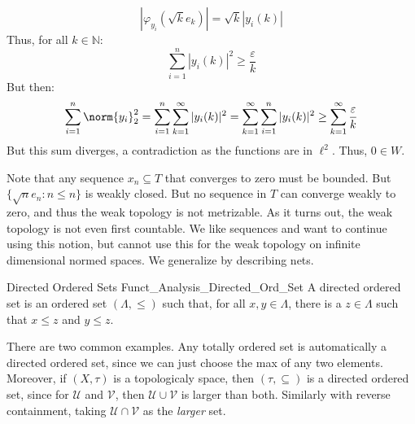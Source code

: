 \begin{lexample}
            \begin{equation}
                |\varphi_{y_{i}}(\sqrt{k}e_{k})|=
                \sqrt{k}|y_{i}(k)|
            \end{equation}
            Thus, for all $k\in\mathbb{N}$:
            \begin{equation}
                \sum_{i=1}^{n}|y_{i}(k)|^{2}\geq
                \frac{\varepsilon}{k}
            \end{equation}
            But then:
            \begin{equation}
                \sum_{i=1}^{n}\norm{y_{i}}_{2}^{2}
                =\sum_{i=1}^{n}\sum_{k=1}^{\infty}
                    |y_{i}(k)|^{2}
                =\sum_{k=1}^{\infty}\sum_{i=1}^{n}
                    |y_{i}(k)|^{2}\geq\sum_{k=1}^{\infty}
                        \frac{\varepsilon}{k}
            \end{equation}
            But this sum diverges, a contradiction as the functions
            are in $\ell^{2}$. Thus, $0\in{W}$.
        \end{lexample}
        Note that any sequence $x_{n}\subseteq{T}$ that converges
        to zero must be bounded. But $\{\sqrt{n}e_{n}:n\leq{n}\}$
        is weakly closed. But no sequence in $T$ can converge weakly
        to zero, and thus the weak topology is not metrizable.
        As it turns out, the weak topology is not even
        first countable. We like sequences and want to continue
        using this notion, but cannot use this for the weak
        topology on infinite dimensional normed spaces. We
        generalize by describing nets.
        \begin{ldefinition}{Directed Ordered Sets}
              {Funct_Analysis_Directed_Ord_Set}
            A directed ordered set is an ordered set
            $(\Lambda,\leq)$ such that, for all $x,y\in\Lambda$,
            there is a $z\in\Lambda$ such that
            $x\leq{z}$ and $y\leq{z}$.
        \end{ldefinition}
        \begin{lexample}
            There are two common examples. Any totally ordered
            set is automatically a directed ordered set,
            since we can just choose the max of any two elements.
            Moreover, if $(X,\tau)$ is a topologicaly space, then
            $(\tau,\subseteq)$ is a directed ordered set, since
            for $\mathcal{U}$ and $\mathcal{V}$, then
            $\mathcal{U}\cup\mathcal{V}$ is larger than both.
            Similarly with reverse containment, taking
            $\mathcal{U}\cap\mathcal{V}$ as the
            \textit{larger} set.
        \end{lexample}
